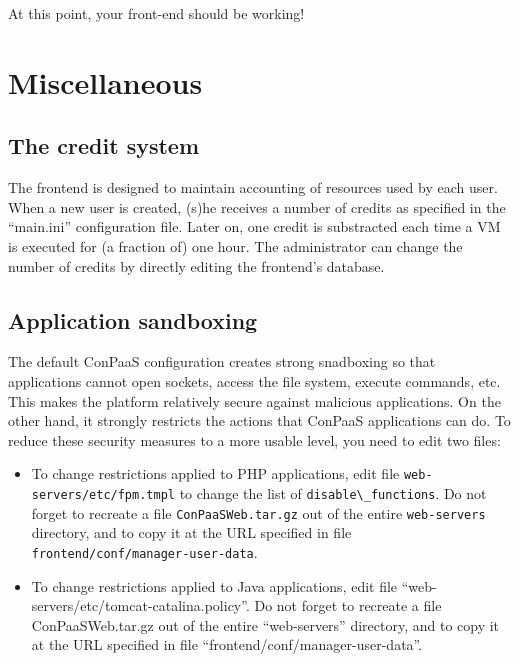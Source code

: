 \documentclass[10pt]{article}
\begin{document}
At this point, your front-end should be working!

\section{Miscellaneous}
\subsection{The credit system}

The frontend is designed to maintain accounting of resources used by
each user. When a new user is created, (s)he receives a number of
credits as specified in the ``main.ini'' configuration file. Later on,
one credit is substracted each time a VM is executed for (a fraction
of) one hour. The administrator can change the number of credits by
directly editing the frontend's database. 

\subsection{Application sandboxing}

The default ConPaaS configuration creates strong snadboxing so that
applications cannot open sockets, access the file system, execute
commands, etc. This makes the platform relatively secure against
malicious applications. On the other hand, it strongly restricts the
actions that ConPaaS applications can do. To reduce these security
measures to a more usable level, you need to edit two files:

\begin{itemize}
\item To change restrictions applied to PHP applications, edit file
  \verb+web-servers/etc/fpm.tmpl+ to change the list of
  \verb+disable\_functions+. Do not forget to recreate a file
  \verb+ConPaaSWeb.tar.gz+ out of the entire \verb+web-servers+
  directory, and to copy it at the URL specified in file
  \verb+frontend/conf/manager-user-data+.
\item To change restrictions applied to Java applications, edit file
  ``web-servers/etc/tomcat-catalina.policy''. Do not forget to
  recreate a file ConPaaSWeb.tar.gz out of the entire ``web-servers''
  directory, and to copy it at the URL specified in file
  ``frontend/conf/manager-user-data''.
\end{itemize}
\end{document}

